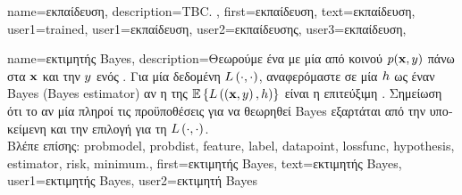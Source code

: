 {name={\foreignlanguage{greek}{εκπαίδευση}}, 
	description={TBC. },
	first={\foreignlanguage{greek}{εκπαίδευση}},
	text={\foreignlanguage{greek}{εκπαίδευση}}, 
	user1={trained},
	user1={\foreignlanguage{greek}{εκπαίδευση}}, %
	user2={\foreignlanguage{greek}{εκπαίδευσης}}, %
	user3={\foreignlanguage{greek}{εκπαίδευση}}, %
}

{name={\foreignlanguage{greek}{εκτιμητής} Bayes},
	description={\foreignlanguage{greek}{Θεωρούμε ένα} 
		 \foreignlanguage{greek}{με μία από κοινού}  $p({\bf x},y)$ 
		\foreignlanguage{greek}{πάνω στα}  ${\bf x}$ \foreignlanguage{greek}{και την}  
		$y$ \foreignlanguage{greek}{ενός} . \foreignlanguage{greek}{Για μία δεδομένη} 
		 $L\left(\cdot,\cdot \right)$, \foreignlanguage{greek}{αναφερόμαστε σε μία}  
		$h$ \foreignlanguage{greek}{ως έναν}  Bayes (Bayes estimator) \foreignlanguage{greek}{αν η} 
		 \foreignlanguage{greek}{της $\mathbb{E}\left\{L\left(\left( {\bf x},y \right),h \right)\right\}$ είναι η} 
		 \foreignlanguage{greek}{επιτεύξιμη}  \cite{LC}. \foreignlanguage{greek}{Σημείωση 
		ότι το αν μία}  \foreignlanguage{greek}{πληροί τις προϋποθέσεις για να θεωρηθεί}  
		Bayes \foreignlanguage{greek}{εξαρτάται από την υποκείμενη}  \foreignlanguage{greek}{και την επιλογή για 
		τη}  $L\left(\cdot,\cdot \right)$.
		\\
		\foreignlanguage{greek}{Βλέπε επίσης:} \gls{probmodel}, \gls{probdist}, \gls{feature}, \gls{label}, \gls{datapoint}, \gls{lossfunc}, 
		\gls{hypothesis}, \gls{estimator}, \gls{risk}, \gls{minimum}.},
	first={\foreignlanguage{greek}{εκτιμητής} Bayes},
	text={\foreignlanguage{greek}{εκτιμητής} Bayes},
	user1={\foreignlanguage{greek}{εκτιμητής} Bayes}, %
    	user2={\foreignlanguage{greek}{εκτιμητή} Bayes} %
}

